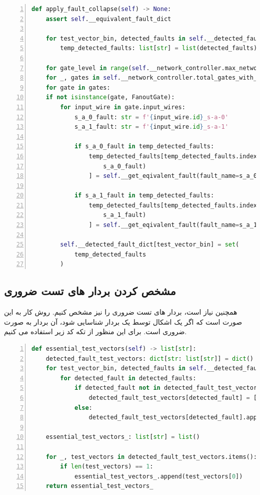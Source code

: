 \small{
	\begin{latin}
		\begin{lstlisting}[numbers=left, breaklines=true,language=Python]
def apply_fault_collapse(self) -> None:
	assert self.__equivalent_fault_dict

	for test_vector_bin, detected_faults in self.__detected_fault_dict.items():
		temp_detected_faults: list[str] = list(detected_faults)

	for gate_level in range(self.__network_controller.max_network_level):
	for _, gates in self.__network_controller.total_gates_with_level.items():
	for gate in gates:
	if not isinstance(gate, FanoutGate):
		for input_wire in gate.input_wires:
			s_a_0_fault: str = f'{input_wire.id}_s-a-0'
			s_a_1_fault: str = f'{input_wire.id}_s-a-1'
			
			if s_a_0_fault in temp_detected_faults:
				temp_detected_faults[temp_detected_faults.index(
					s_a_0_fault)
				] = self.__get_eqivalent_fault(fault_name=s_a_0_fault)

			if s_a_1_fault in temp_detected_faults:
				temp_detected_faults[temp_detected_faults.index(
					s_a_1_fault)
				] = self.__get_eqivalent_fault(fault_name=s_a_1_fault)

		self.__detected_fault_dict[test_vector_bin] = set(
			temp_detected_faults
		)
		\end{lstlisting}
	\end{latin}
}

\subsection{مشخص کردن بردار های تست ضروری}
همچنین نیاز است، بردار های تست ضروری
 را نیز مشخص کنیم. روش کار به این صورت است که اگر یک اشکال توسط یک بردار شناسایی شود، آن بردار به صورت ضروری است. برای این منظور از تکه کد زیر استفاده می کنیم.
 
\small{
	\begin{latin}
		\begin{lstlisting}[numbers=left, breaklines=true,language=Python]
def essential_test_vectors(self) -> list[str]:
	detected_fault_test_vectors: dict[str: list[str]] = dict()
	for test_vector_bin, detected_faults in self.__detected_fault_dict.items():
		for detected_fault in detected_faults:
			if detected_fault not in detected_fault_test_vectors:
				detected_fault_test_vectors[detected_fault] = [test_vector_bin]
			else:
				detected_fault_test_vectors[detected_fault].append(test_vector_bin)

	essential_test_vectors_: list[str] = list()

	for _, test_vectors in detected_fault_test_vectors.items():
		if len(test_vectors) == 1:
			essential_test_vectors_.append(test_vectors[0])
	return essential_test_vectors_
		\end{lstlisting}
	\end{latin}
}

